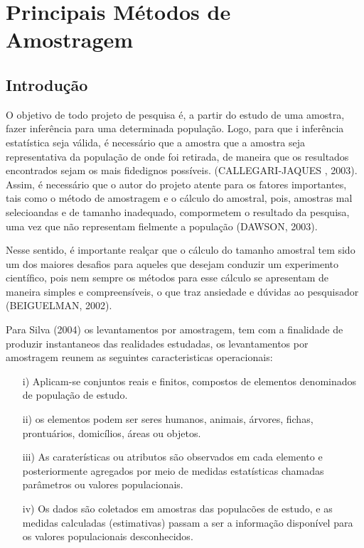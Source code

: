 \chapter{Principais Métodos de Amostragem}

\section{Introdução}

O objetivo de todo projeto de pesquisa é, a partir do estudo de uma amostra, fazer inferência para uma determinada população. Logo, para que i inferência estatística seja válida, é necessário que a amostra que a amostra seja representativa da população de onde foi retirada, de maneira que os resultados encontrados sejam os mais fidedignos possíveis. (CALLEGARI-JAQUES , 2003). Assim, é necessário que o autor do projeto atente para os fatores importantes, tais como o método de amostragem e o cálculo do amostral, pois, amostras mal selecioandas e de tamanho inadequado, compormetem o resultado da pesquisa, uma vez que não representam fielmente a população (DAWSON, 2003).
\vskip0.3cm

Nesse sentido, é importante realçar que o cálculo do tamanho amostral
tem sido um dos maiores desafios para aqueles que desejam conduzir um experimento científico, pois nem sempre os métodos para esse cálculo se apresentam de maneira simples e compreensíveis, o que traz ansiedade e dúvidas ao pesquisador (BEIGUELMAN, 2002).
\vskip0.3cm

Para Silva (2004) os levantamentos por amostragem, tem com a
finalidade de produzir instantaneos das realidades estudadas, os
levantamentos por amostragem reunem as seguintes caracteristicas
operacionais:

\begin{enumerate}
    \item[{i})] Aplicam-se conjuntos reais e finitos, compostos de
    elementos denominados de população de estudo.
    \item[{ii})] os elementos podem ser seres humanos, animais, árvores,
    fichas, prontuários, domicílios, áreas ou objetos.
    \item[{iii})] As caraterísticas ou atributos são observados em cada
    elemento e posteriormente agregados por meio de medidas
    estatísticas chamadas parâmetros ou valores populacionais.
    \item[{iv})] Os dados são coletados em amostras das populacões de
    estudo, e as medidas calculadas (estimativas) passam a ser a
    informação disponível para os valores populacionais
    desconhecidos.
\end{enumerate}


